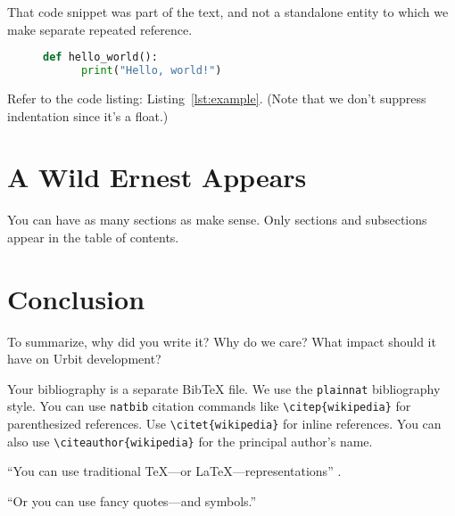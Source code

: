 \documentclass[twoside]{article}
\begin{document}
\noindent
That code snippet was part of the text, and not a standalone entity to which we make separate repeated reference.

\begin{figure}
  \begin{lstlisting}[language=Python, caption={Example Python Code}, label={lst:example}]
  def hello_world():
      print("Hello, world!")
  \end{lstlisting}
\end{figure}

Refer to the code listing: Listing~\ref{lst:example}.  (Note that we don't suppress indentation since it's a float.)


\section{A Wild Ernest Appears}

You can have as many sections as make sense.  Only sections and subsections appear in the table of contents.

\section{Conclusion}

To summarize, why did you write it?  Why do we care?  What impact should it have on Urbit development?

Your bibliography is a separate BibTeX file.  We use the \texttt{plainnat} bibliography style.  You can use \texttt{natbib} citation commands like \texttt{\textbackslash citep\{wikipedia\}} for parenthesized references.  Use \texttt{\textbackslash citet\{wikipedia\}} for inline references.  You can also use \texttt{\textbackslash citeauthor\{wikipedia\}} for the principal author's name.

``You can use traditional TeX---or LaTeX---representations'' \citep{Varney1987}.

“Or you can use fancy quotes—and symbols.”



\end{document}
